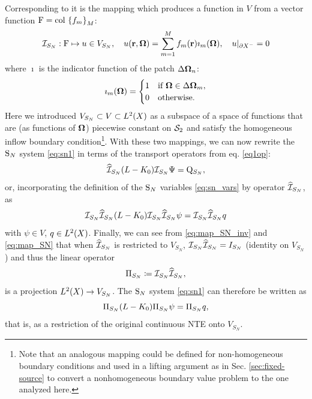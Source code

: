 %
Corresponding to it is the mapping which produces a function in $V$ from a vector function 
\mbox{$\mathrm{F} = \colset{f_m}{\idxset{M}}$}:
\begin{equation}\label{eq:map_SN}
\PiSN: \mathrm{F} \mapsto u\in V_{S_N},\quad
u(\br,\bomega) = \sum_{m=1}^M f_m(\br)\imath_m(\bomega),\quad
u\vert_{\pX[-]} = 0
\end{equation}
where $\imath$ is the indicator function of the patch $\Delta\bomega_n$:
\begin{equation}\label{eq:indicator}
\imath_m(\bomega) = \pw{1}{if $\bomega \in \Delta\bomega_m$}{0}{otherwise.}
\end{equation}
Here we introduced $V_{S_N}\subset V \subset \Lp[2](X)$ as a subspace of a space of functions that
are (as functions of $\bomega$) piecewise constant on $\Sphere$ and satisfy the homogeneous inflow boundary condition\footnote{Note that an
analogous mapping could be defined for non-homogeneous boundary conditions and used in a lifting argument
as in Sec. \ref{sec:fixed-source} to convert a nonhomogeneous boundary value problem to the one analyzed here.}. With
these two mappings, we can now rewrite the $\SN$ system \eqref{eq:sn1} in terms of the transport operators from eq.
\eqref{eq1op}:
\begin{equation}\label{eq:sn_op}
	\PihSN (\op{L} - \op{K}_0) \PiSN \Psi = \mathrm{Q}_{S_N},
\end{equation}
or, incorporating the definition of the $\SN$ variables \eqref{eq:sn_vars} by operator $\PihSN$, as
\begin{equation}\label{eq:sn_op2}
	\PiSN \PihSN (\op{L} - \op{K}_0)\PiSN \PihSN \psi = \PiSN \PihSN q
\end{equation} 
with $\psi \in V$, $q \in \Lp[2](X)$. Finally, we can see from \eqref{eq:map_SN_inv} and \eqref{eq:map_SN} that when
$\PihSN$ is restricted to $V_{S_N}$, $\PiSN\PihSN = I_{S_N}$ (identity on $V_{S_N}$) and thus the linear operator
\begin{equation}\label{eq:proj_sn}
	\Projop[S_N] \coloneqq \PiSN\PihSN,
\end{equation}
is a projection $\Lp[2](X)\to V_{S_N}$. The $\SN$ system \eqref{eq:sn1} can
therefore be written as
\begin{equation}\label{eq:sn_op3}
	\Projop[S_N] (\op{L} - \op{K}_0)\Projop[S_N] \psi = \Projop[S_N] q,
\end{equation}
that is, as a restriction of the original continuous NTE onto $V_{S_N}$. 

